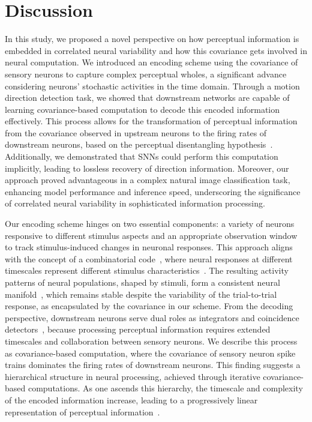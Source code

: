 \section{Discussion}
In this study, we proposed a novel perspective on how perceptual information is embedded in correlated neural variability and how this covariance gets involved in neural computation.
We introduced an encoding scheme using the covariance of sensory neurons to capture complex perceptual wholes, a significant advance considering neurons' stochastic activities in the time domain.
Through a motion direction detection task, we showed that downstream networks are capable of learning covariance-based computation to decode this encoded information effectively. 
This process allows for the transformation of perceptual information from the covariance observed in upstream neurons to the firing rates of downstream neurons, based on the perceptual disentangling hypothesis~\cite{DiCarlo2007, DiCarlo2012}. 
Additionally, we demonstrated that SNNs could perform this computation implicitly, leading to lossless recovery of direction information. 
Moreover, our approach proved advantageous in a complex natural image classification task, enhancing model performance and inference speed, underscoring the significance of correlated neural variability in sophisticated information processing.

Our encoding scheme hinges on two essential components: a variety of neurons responsive to different stimulus aspects and an appropriate observation window to track stimulus-induced changes in neuronal responses. 
This approach aligns with the concept of a combinatorial code~\cite{Malnic1999, Osborne2008}, where neural responses at different timescales represent different stimulus characteristics~\cite{Panzeri2010}.
The resulting activity patterns of neural populations, shaped by stimuli, form a consistent neural manifold~\cite{DiCarlo2007, DiCarlo2012}, which remains stable despite the variability of the trial-to-trial response, as encapsulated by the covariance in our scheme.
From the decoding perspective, downstream neurons serve dual roles as integrators and coincidence detectors~\cite{Koenig1996}, because processing perceptual information requires extended timescales and collaboration between sensory neurons. 
We describe this process as covariance-based computation, where the covariance of sensory neuron spike trains dominates the firing rates of downstream neurons.
This finding suggests a hierarchical structure in neural processing, achieved through iterative covariance-based computations. 
As one ascends this hierarchy, the timescale and complexity of the encoded information increase, leading to a progressively linear representation of perceptual information~\cite{piasini2021temporal, Siegle2021}.

